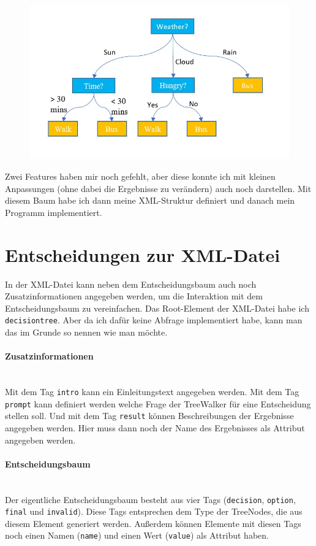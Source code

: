 \documentclass[a4paper,12pt]{article}
\newcommand{\myparagraph}[1]{\paragraph*{#1}\mbox{}\\}
\begin{document}
\begin{figure}[h]
	\centering
	\includegraphics[width=\linewidth]{tree.png}
\end{figure}

Zwei Features haben mir noch gefehlt, aber diese konnte ich mit kleinen Anpassungen (ohne dabei die Ergebnisse zu verändern) auch noch darstellen.
Mit diesem Baum habe ich dann meine XML-Struktur definiert und danach mein Programm implementiert. 

\newpage
\section*{Entscheidungen zur XML-Datei}
In der XML-Datei kann neben dem Entscheidungsbaum auch noch Zusatzinformationen angegeben werden, um die Interaktion mit dem Entscheidungsbaum zu vereinfachen. 
Das Root-Element der XML-Datei habe ich \texttt{decisiontree}. Aber da ich dafür keine Abfrage implementiert habe, kann man das im Grunde so nennen wie man möchte.

\myparagraph{Zusatzinformationen}
Mit dem Tag \texttt{intro} kann ein Einleitungstext angegeben werden. 
Mit dem Tag \texttt{prompt} kann definiert werden welche Frage der TreeWalker für eine Entscheidung stellen soll.
Und mit dem Tag \texttt{result} können Beschreibungen der Ergebnisse angegeben werden. Hier muss dann noch der Name des Ergebnisses als Attribut angegeben werden.

\myparagraph{Entscheidungsbaum}
Der eigentliche Entscheidungsbaum besteht aus vier Tags (\texttt{decision}, \texttt{option}, \texttt{final} und \texttt{invalid}). 
Diese Tags entsprechen dem Type der TreeNodes, die aus diesem Element generiert werden.
Außerdem können Elemente mit diesen Tags noch einen Namen (\texttt{name}) und einen Wert (\texttt{value}) als Attribut haben.
\end{document}
